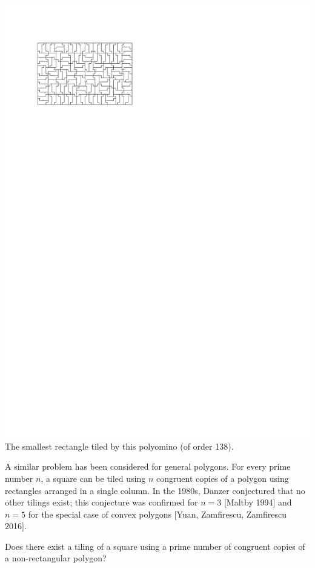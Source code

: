\documentclass{patmorin}
\begin{document}
\begin{center}
  \includegraphics{figs/tiling.pdf}\\
  {The smallest rectangle tiled by this polyomino (of order 138).}
\end{center}

A similar problem has been considered for general polygons. For every prime number $n$, a square can be tiled using $n$ congruent copies of a polygon using rectangles arranged in a single column. In the 1980s, Danzer conjectured that no other tilings exist; this conjecture was confirmed for $n = 3$ [Maltby 1994] and $n = 5$ for the special case of convex polygons [Yuan, Zamfirescu, Zamfirescu 2016].

\begin{op}
Does there exist a tiling of a square using a prime number of congruent copies of a non-rectangular polygon?
\end{op}
\end{document}
